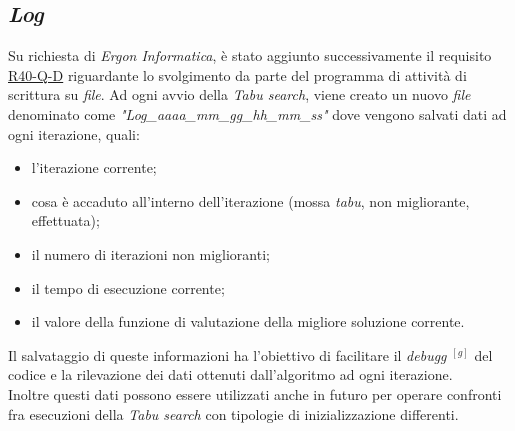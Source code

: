 \subsection{\textit{Log}}
\label{sec:log}
\noindent Su richiesta di \textit{Ergon Informatica}, è stato aggiunto successivamente il requisito \hyperref[tab:requisiti-qualitativi]{R40-Q-D}
riguardante lo svolgimento da parte del programma di attività di scrittura
su \textit{file}. Ad ogni avvio della \textit{Tabu search}, viene creato un nuovo
\textit{file} denominato come \textit{"Log\_aaaa\_mm\_gg\_hh\_mm\_ss"}
dove vengono salvati dati ad ogni iterazione, quali:
\begin{itemize}
    \item l'iterazione corrente;
    \item cosa è accaduto all'interno dell'iterazione (mossa \textit{tabu}, non migliorante, effettuata);
    \item il numero di iterazioni non miglioranti;
    \item il tempo di esecuzione corrente;
    \item il valore della funzione di valutazione della migliore soluzione corrente.
\end{itemize}
Il salvataggio di queste informazioni ha
l’obiettivo di facilitare il \textit{\gls{debugg}} $^{[g]}$
del codice e la rilevazione dei dati ottenuti
dall’algoritmo ad ogni iterazione.\\
Inoltre questi dati possono essere utilizzati anche in futuro
per operare confronti fra esecuzioni della \textit{Tabu search} con
tipologie di inizializzazione differenti.

\newpage

